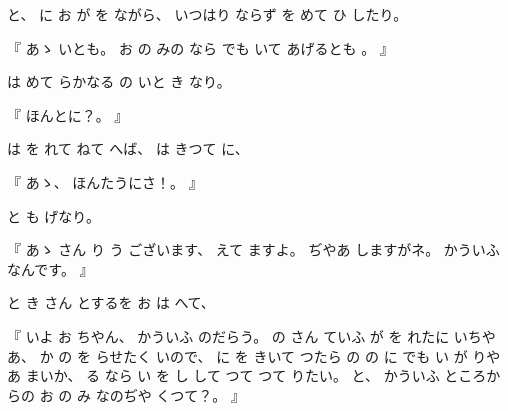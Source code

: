 %
と、
%
に
お
が
を
ながら、
%
いつはり
ならず
を
めて
ひ
したり。

%
『
あゝ
いとも。
%
お
の
みの
なら
でも
いて
あげるとも
。
』

%
は
めて
らかなる
の
いと
き
なり。

%
『
ほんとに？。
』

%
は
を
れて
ねて
へば、
%
は
きつて
に、

%
『
あゝ、
%
ほんたうにさ！。
』

%
と
も
げなり。

%
『
あゝ
さん
り
う
ございます、
%
えて%
ますよ。
%
ぢやあ
しますがネ。
%
かういふ
なんです。
』

%
と
き
さん
とするを
お
は
へて、

%
『
いよ
お
ちやん、
%
かういふ
のだらう。
%
の
さん
ていふ
が
を
れたに
いちやあ、
%
か
の
を
らせたく
いので、
%
に
を
きいて
つたら
の
の
に
でも
い
が
りやあ
まいか、
%
る
なら
い
を
し
して
つて
%
つて
りたい。
%
と、
%
かういふ
ところからの
お
の
み
なのぢや
くつて？。
』

